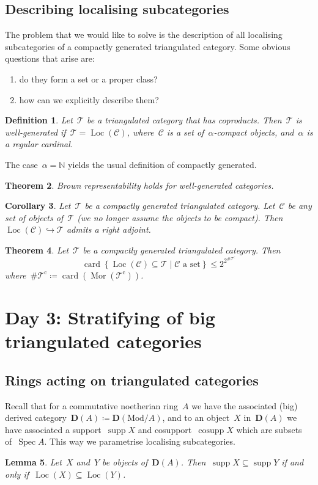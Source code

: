 \documentclass[10pt,a4paper]{article}
\theoremstyle{lecture}
\newtheorem{theorem}{Theorem}
\newtheorem{corollary}[theorem]{Corollary}
\newtheorem{definition}[theorem]{Definition}
\newtheorem{lemma}[theorem]{Lemma}
\newcommand\dash{\nobreakdash-\hspace{0pt}}
\newcommand\cc{\ensuremath{\mathrm{c}}}
\newcommand\derived{\ensuremath{\mathbf{D}}}
\newcommand\Mod{\ensuremath{\mathrm{Mod}}}
\DeclareMathOperator\cosupp{cosupp}
\DeclareMathOperator\Loc{Loc}
\DeclareMathOperator\Mor{Mor}
\DeclareMathOperator\Spec{Spec}
\DeclareMathOperator\supp{supp}
\begin{document}
\subsection{Describing localising subcategories}
The problem that we would like to solve is the description of all localising subcategories of a compactly generated triangulated category. Some obvious questions that arise are:
\begin{enumerate}
  \item do they form a set or a proper class?
  \item how can we explicitly describe them?
\end{enumerate}

\begin{definition}
  Let~$\mathcal{T}$ be a triangulated category that has coproducts. Then~$\mathcal{T}$ is \emph{well-generated} if~$\mathcal{T}=\Loc(\mathcal{C})$, where~$\mathcal{C}$ is a set of~$\alpha$\dash compact objects, and~$\alpha$ is a regular cardinal.
\end{definition}
The case~$\alpha=\mathbb{N}$ yields the usual definition of compactly generated.
\begin{theorem}
  Brown representability holds for well-generated categories.
\end{theorem}
\begin{corollary}
  Let~$\mathcal{T}$ be a compactly generated triangulated category. Let~$\mathcal{C}$ be any set of objects of~$\mathcal{T}$ (we no longer assume the objects to be compact). Then~$\Loc(\mathcal{C})\hookrightarrow\mathcal{T}$ admits a right adjoint.
\end{corollary}
\begin{theorem}
  Let~$\mathcal{T}$ be a compactly generated triangulated category. Then
  \begin{equation}
    \operatorname{card}\left\{ \Loc(\mathcal{C})\subseteq\mathcal{T}\mid\text{$\mathcal{C}$ a set} \right\}\leq 2^{2^{\#\mathcal{T}^\cc}}
  \end{equation}
  where~$\#\mathcal{T}^\cc\coloneqq\operatorname{card}(\Mor(\mathcal{T}^\cc))$.
\end{theorem}

\section{Day 3: Stratifying of big triangulated categories}
\subsection{Rings acting on triangulated categories}
Recall that for a commutative noetherian ring~$A$ we have the associated (big) derived category~$\derived(A)\coloneqq\derived(\Mod/A)$, and to an object~$X$ in~$\derived(A)$ we have associated a support~$\supp X$ and cosupport~$\cosupp X$ which are subsets of~$\Spec A$. This way we parametrise localising subcategories.
\begin{lemma}
  Let~$X$ and~$Y$ be objects of~$\derived(A)$. Then~$\supp X\subseteq \supp Y$ if and only if~$\Loc(X)\subseteq\Loc(Y)$.
\end{lemma}
\end{document}
